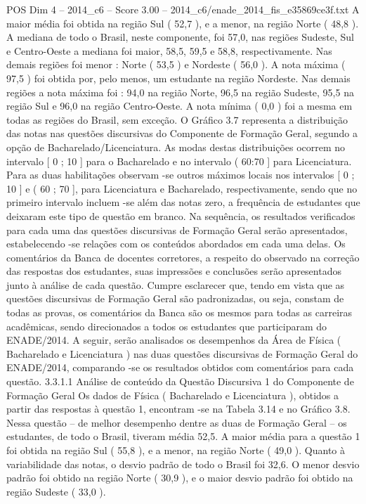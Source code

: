 \begin{textsample}{POS Dim 4 – 2014\_c6 – Score 3.00 – 2014\_c6/enade\_2014\_fis\_e35869ce3f.txt}
A maior média foi obtida na região Sul ( 52,7 ), e a menor, na região Norte ( 48,8 ).
A mediana de todo o Brasil, neste componente, foi 57,0, nas regiões Sudeste, Sul e Centro-Oeste a mediana foi maior, 58,5, 59,5 e 58,8, respectivamente.
Nas demais regiões foi menor : Norte ( 53,5 ) e Nordeste ( 56,0 ).
A nota máxima ( 97,5 ) foi obtida por, pelo menos, um estudante na região Nordeste.
Nas demais regiões a nota máxima foi : 94,0 na região Norte, 96,5 na região Sudeste, 95,5 na região Sul e 96,0 na região Centro-Oeste.
A nota mínima ( 0,0 ) foi a mesma em todas as regiões do Brasil, sem exceção.
O Gráfico 3.7 representa a distribuição das notas nas questões discursivas do Componente de Formação Geral, segundo a opção de Bacharelado/Licenciatura.
As modas destas distribuições ocorrem no intervalo [ 0 ; 10 ] para o Bacharelado e no intervalo ( 60:70 ] para Licenciatura.
Para as duas habilitações observam -se outros máximos locais nos intervalos [ 0 ; 10 ] e ( 60 ; 70 ], para Licenciatura e Bacharelado, respectivamente, sendo que no primeiro intervalo incluem -se além das notas zero, a frequência de estudantes que deixaram este tipo de questão em branco.
Na sequência, os resultados verificados para cada uma das questões discursivas de Formação Geral serão apresentados, estabelecendo -se relações com os conteúdos abordados em cada uma delas.
Os comentários da Banca de docentes corretores, a respeito do observado na correção das respostas dos estudantes, suas impressões e conclusões serão apresentados junto à análise de cada questão.
Cumpre esclarecer que, tendo em vista que as questões discursivas de Formação Geral são padronizadas, ou seja, constam de todas as provas, os comentários da Banca são os mesmos para todas as carreiras acadêmicas, sendo direcionados a todos os estudantes que participaram do ENADE/2014.
A seguir, serão analisados os desempenhos da Área de Física ( Bacharelado e Licenciatura ) nas duas questões discursivas de Formação Geral do ENADE/2014, comparando -se os resultados obtidos com comentários para cada questão. 3.3.1.1 Análise de conteúdo da Questão Discursiva 1 do Componente de Formação Geral Os dados de Física ( Bacharelado e Licenciatura ), obtidos a partir das respostas à questão 1, encontram -se na Tabela 3.14 e no Gráfico 3.8.
Nessa questão – de melhor desempenho dentre as duas de Formação Geral – os estudantes, de todo o Brasil, tiveram média 52,5.
A maior média para a questão 1 foi obtida na região Sul ( 55,8 ), e a menor, na região Norte ( 49,0 ).
Quanto à variabilidade das notas, o desvio padrão de todo o Brasil foi 32,6.
O menor desvio padrão foi obtido na região Norte ( 30,9 ), e o maior desvio padrão foi obtido na região Sudeste ( 33,0 ).

\end{textsample}
